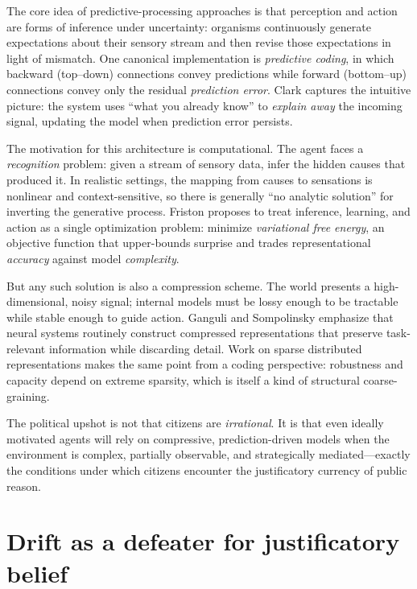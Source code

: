 \documentclass[12pt]{report}
\begin{document}
The core idea of predictive-processing approaches is that perception and action are forms of inference under uncertainty: organisms continuously generate expectations about their sensory stream and then revise those expectations in light of mismatch. One canonical implementation is \emph{predictive coding}, in which backward (top--down) connections convey predictions while forward (bottom--up) connections convey only the residual \emph{prediction error}.\parencite[p.~816]{friston2005theory} Clark captures the intuitive picture: the system uses \enquote{what you already know} to \emph{explain away} the incoming signal, updating the model when prediction error persists.\parencite[p.~183]{clark2013whatever}

The motivation for this architecture is computational. The agent faces a \emph{recognition} problem: given a stream of sensory data, infer the hidden causes that produced it. In realistic settings, the mapping from causes to sensations is nonlinear and context-sensitive, so there is generally \enquote{no analytic solution} for inverting the generative process.\parencite[p.~816]{friston2005theory} Friston proposes to treat inference, learning, and action as a single optimization problem: minimize \emph{variational free energy}, an objective function that upper-bounds surprise and trades representational \emph{accuracy} against model \emph{complexity}.\parencite[pp.~127--128]{friston2010freeenergy}

But any such solution is also a compression scheme. The world presents a high-dimensional, noisy signal; internal models must be lossy enough to be tractable while stable enough to guide action. Ganguli and Sompolinsky emphasize that neural systems routinely construct compressed representations that preserve task-relevant information while discarding detail.\parencite[pp.~491--492]{ganguli2012compressed} Work on sparse distributed representations makes the same point from a coding perspective: robustness and capacity depend on extreme sparsity, which is itself a kind of structural coarse-graining.\parencite[p.~1]{ahmadHawkins2016sdr}

The political upshot is not that citizens are \emph{irrational}. It is that even ideally motivated agents will rely on compressive, prediction-driven models when the environment is complex, partially observable, and strategically mediated---exactly the conditions under which citizens encounter the justificatory currency of public reason.
\section{Drift as a defeater for justificatory belief}
\label{sec:drift-defeater}
\end{document}
